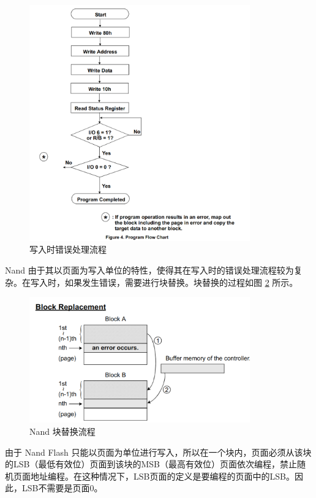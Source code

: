 \begin{figure}[htbp]
  \centering
  \includegraphics[width=0.85\textwidth]{fig/nand-rw-err.png}
  \caption{写入时错误处理流程}
  \label{nand-rw-err}
\end{figure}

Nand 由于其以页面为写入单位的特性，使得其在写入时的错误处理流程较为复杂。在写入时，如果发生错误，需要进行块替换。块替换的过程如图 \ref{nand-replace} 所示。

\begin{figure}[htbp]
  \centering
  \includegraphics[width=0.85\textwidth]{fig/nand-replace.png}
  \caption{Nand 块替换流程}
  \label{nand-replace}
\end{figure}

由于 Nand Flash 只能以页面为单位进行写入，所以在一个块内，页面必须从该块的LSB（最低有效位）页面到该块的MSB（最高有效位）页面依次编程，禁止随机页面地址编程。在这种情况下，LSB页面的定义是要编程的页面中的LSB。因此，LSB不需要是页面0。

